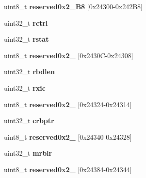 \begin{DoxyCompactItemize}
uint8\+\_\+t {\bfseries reserved0x2\+\_\+B8} \mbox{[}0x24300-\/0x242\+B8\mbox{]}
\item 
\mbox{\label{structtsec__registers_a243b1e19f518c7fadf68182bdfa83c09}} 
uint32\+\_\+t {\bfseries rctrl}
\item 
\mbox{\label{structtsec__registers_aa2a9251f25314fa0c23277b46cb4528f}} 
uint32\+\_\+t {\bfseries rstat}
\item 
\mbox{\label{structtsec__registers_a4d429139ebb6b817b6048726fecf324c}} 
uint8\+\_\+t {\bfseries reserved0x2\+\_} \mbox{[}0x2430\+C-\/0x24308\mbox{]}
\item 
\mbox{\label{structtsec__registers_a33acbfd9c4bcb48505261de0322fd46e}} 
uint32\+\_\+t {\bfseries rbdlen}
\item 
\mbox{\label{structtsec__registers_ad60df55a629b8da1ade62b040df51837}} 
uint32\+\_\+t {\bfseries rxic}
\item 
\mbox{\label{structtsec__registers_a749041ebe19a8f7e799e74d6e43c0548}} 
uint8\+\_\+t {\bfseries reserved0x2\+\_} \mbox{[}0x24324-\/0x24314\mbox{]}
\item 
\mbox{\label{structtsec__registers_aebe66a547496cb0542817f1b87cacafa}} 
uint32\+\_\+t {\bfseries crbptr}
\item 
\mbox{\label{structtsec__registers_aa01015d05d30425e70325df0e9ac5b54}} 
uint8\+\_\+t {\bfseries reserved0x2\+\_} \mbox{[}0x24340-\/0x24328\mbox{]}
\item 
\mbox{\label{structtsec__registers_af638228d319320593fa0820761d5dfd7}} 
uint32\+\_\+t {\bfseries mrblr}
\item 
\mbox{\label{structtsec__registers_a66f9129edc7ca63e6125d1e6908e2c3b}} 
uint8\+\_\+t {\bfseries reserved0x2\+\_} \mbox{[}0x24384-\/0x24344\mbox{]}
\item 
\mbox{\label{structtsec__registers_a52bcdc612cd5e6f1b0cd6fd8bb8d4563}} 

\end{DoxyCompactItemize}

